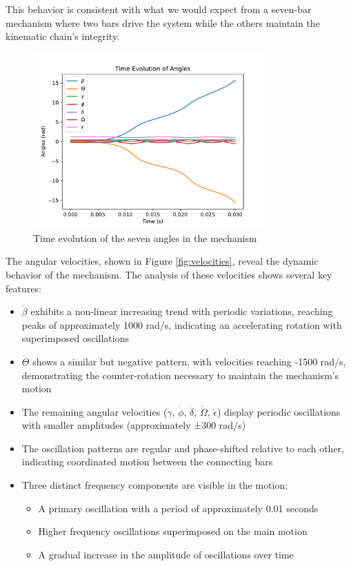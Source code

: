 \documentclass{article}
\begin{document}
This behavior is consistent with what we would expect from a seven-bar mechanism where two bars drive the system while the others maintain the kinematic chain's integrity.

\begin{figure}[H]
    \centering
    \includegraphics[width=0.8\textwidth]{plots/angles.pdf}
    \caption{Time evolution of the seven angles in the mechanism}
    \label{fig:angles}
\end{figure}

\FloatBarrier

The angular velocities, shown in Figure \ref{fig:velocities}, reveal the dynamic behavior of the mechanism. The analysis of these velocities shows several key features:

\begin{itemize}
    \item $\dot{\beta}$ exhibits a non-linear increasing trend with periodic variations, reaching peaks of approximately 1000 rad/s, indicating an accelerating rotation with superimposed oscillations
    \item $\dot{\Theta}$ shows a similar but negative pattern, with velocities reaching -1500 rad/s, demonstrating the counter-rotation necessary to maintain the mechanism's motion
    \item The remaining angular velocities ($\dot{\gamma}$, $\dot{\phi}$, $\dot{\delta}$, $\dot{\Omega}$, $\dot{\epsilon}$) display periodic oscillations with smaller amplitudes (approximately ±300 rad/s)
    \item The oscillation patterns are regular and phase-shifted relative to each other, indicating coordinated motion between the connecting bars
    \item Three distinct frequency components are visible in the motion:
    \begin{itemize}
        \item A primary oscillation with a period of approximately 0.01 seconds
        \item Higher frequency oscillations superimposed on the main motion
        \item A gradual increase in the amplitude of oscillations over time
    \end{itemize}
\end{itemize}
\end{document}

